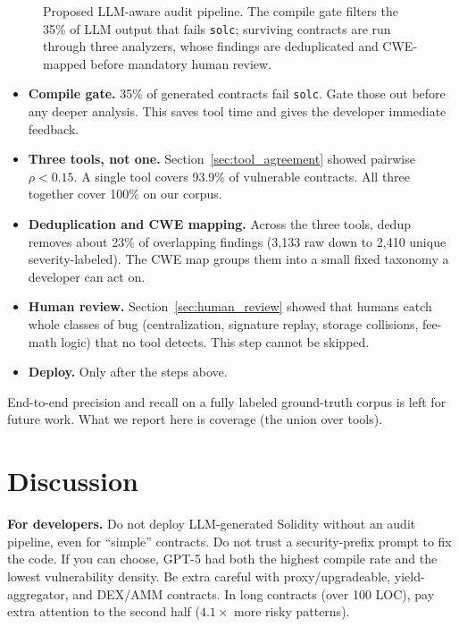 \documentclass[11pt]{article}
\begin{document}
\begin{figure}[H]
    \caption{Proposed LLM-aware audit pipeline. The compile gate filters the 35\% of LLM output that fails \texttt{solc}; surviving contracts are run through three analyzers, whose findings are deduplicated and CWE-mapped before mandatory human review.}
    \label{fig:pipeline_proposed}
\end{figure}

\begin{itemize}[leftmargin=*]
    \item \textbf{Compile gate.} 35\% of generated contracts fail \texttt{solc}. Gate those out before any deeper analysis. This saves tool time and gives the developer immediate feedback.
    \item \textbf{Three tools, not one.} Section~\ref{sec:tool_agreement} showed pairwise $\rho < 0.15$. A single tool covers 93.9\% of vulnerable contracts. All three together cover 100\% on our corpus.
    \item \textbf{Deduplication and CWE mapping.} Across the three tools, dedup removes about 23\% of overlapping findings (3,133 raw down to 2,410 unique severity-labeled). The CWE map groups them into a small fixed taxonomy a developer can act on.
    \item \textbf{Human review.} Section~\ref{sec:human_review} showed that humans catch whole classes of bug (centralization, signature replay, storage collisions, fee-math logic) that no tool detects. This step cannot be skipped.
    \item \textbf{Deploy.} Only after the steps above.
\end{itemize}

End-to-end precision and recall on a fully labeled ground-truth corpus is left for future work. What we report here is coverage (the union over tools).

\section{Discussion}
\label{sec:discussion}

\textbf{For developers.} Do not deploy LLM-generated Solidity without an audit pipeline, even for ``simple'' contracts. Do not trust a security-prefix prompt to fix the code. If you can choose, GPT-5 had both the highest compile rate and the lowest vulnerability density. Be extra careful with proxy/upgradeable, yield-aggregator, and DEX/AMM contracts. In long contracts (over 100 LOC), pay extra attention to the second half ($4.1\times$ more risky patterns).
\end{document}
